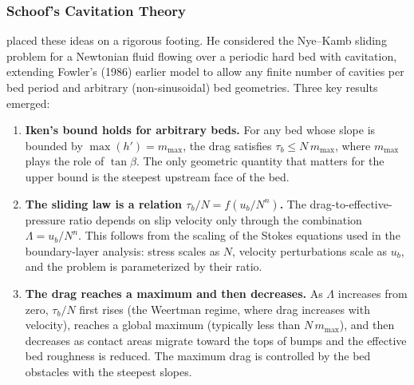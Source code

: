 \documentclass[11pt]{article}
\begin{document}
\subsubsection{Schoof's Cavitation Theory}
\label{sec:schoof_cavitation}

\cite{Schoof2005} placed these ideas on a rigorous footing.  He considered the Nye--Kamb sliding problem for a Newtonian fluid flowing over a periodic hard bed with cavitation, extending Fowler's (1986) earlier model to allow any finite number of cavities per bed period and arbitrary (non-sinusoidal) bed geometries.  Three key results emerged:

\begin{enumerate}
  \item \textbf{Iken's bound holds for arbitrary beds.}  For any bed whose slope is bounded by $\max(h') = m_{\max}$, the drag satisfies $\tau_b \leq N\,m_{\max}$, where $m_{\max}$ plays the role of $\tan\beta$.  The only geometric quantity that matters for the upper bound is the steepest upstream face of the bed.

  \item \textbf{The sliding law is a relation $\tau_b/N = f(u_b / N^n)$.}  The drag-to-effective-pressure ratio depends on slip velocity only through the combination $\Lambda = u_b / N^n$.  This follows from the scaling of the Stokes equations used in the boundary-layer analysis: stress scales as $N$, velocity perturbations scale as $u_b$, and the problem is parameterized by their ratio.

  \item \textbf{The drag reaches a maximum and then decreases.}  As $\Lambda$ increases from zero, $\tau_b/N$ first rises (the Weertman regime, where drag increases with velocity), reaches a global maximum (typically less than $N\,m_{\max}$), and then decreases as contact areas migrate toward the tops of bumps and the effective bed roughness is reduced.  The maximum drag is controlled by the bed obstacles with the steepest slopes.
\end{enumerate}
\end{document}

